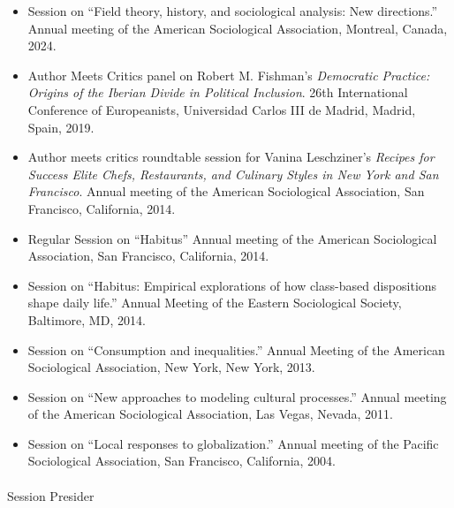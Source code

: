 \documentclass[
]{article}
\makeatletter
\let\oldparagraph\paragraph
\renewcommand{\paragraph}{
    \@ifstar
      \xxxParagraphStar
      \xxxParagraphNoStar
  }
\newcommand{\xxxParagraphStar}[1]{\oldparagraph*{#1}\mbox{}}
\newcommand{\xxxParagraphNoStar}[1]{\oldparagraph{#1}\mbox{}}
\providecommand{\tightlist}{%
  \setlength{\itemsep}{0pt}\setlength{\parskip}{0pt}}
\makeatother
\begin{document}
\begin{itemize}
\tightlist
\item
  Session on ``Field theory, history, and sociological analysis: New
  directions.'' Annual meeting of the American Sociological Association,
  Montreal, Canada, 2024.
\item
  Author Meets Critics panel on Robert M. Fishman's \emph{Democratic
  Practice: Origins of the Iberian Divide in Political Inclusion}. 26th
  International Conference of Europeanists, Universidad Carlos III de
  Madrid, Madrid, Spain, 2019.
\item
  Author meets critics roundtable session for Vanina Leschziner's
  \emph{Recipes for Success Elite Chefs, Restaurants, and Culinary
  Styles in New York and San Francisco}. Annual meeting of the American
  Sociological Association, San Francisco, California, 2014.
\item
  Regular Session on ``Habitus'' Annual meeting of the American
  Sociological Association, San Francisco, California, 2014.
\item
  Session on ``Habitus: Empirical explorations of how class-based
  dispositions shape daily life.'' Annual Meeting of the Eastern
  Sociological Society, Baltimore, MD, 2014.
\item
  Session on ``Consumption and inequalities.'' Annual Meeting of the
  American Sociological Association, New York, New York, 2013.
\item
  Session on ``New approaches to modeling cultural processes.'' Annual
  meeting of the American Sociological Association, Las Vegas, Nevada,
  2011.
\item
  Session on ``Local responses to globalization.'' Annual meeting of the
  Pacific Sociological Association, San Francisco, California, 2004.
\end{itemize}

\paragraph{Session Presider}\label{session-presider}
\end{document}
